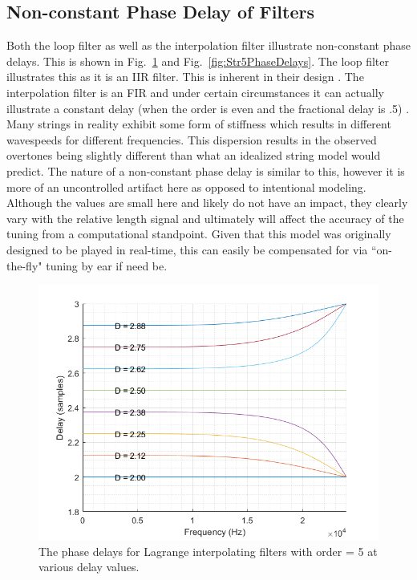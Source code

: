 \documentclass[../main.tex]{subfiles}
\begin{document}
\subsection{Non-constant Phase Delay of Filters}
Both the loop filter as well as the interpolation filter illustrate non-constant phase delays. This is shown in Fig.~\ref{fig:LagrangePhaseDelays} and Fig.~\ref{fig:Str5PhaseDelays}. The loop filter illustrates this as it is an IIR filter. This is inherent in their design . The interpolation filter is an FIR and under certain circumstances it can actually illustrate a constant delay (when the order is even and the fractional delay is .5) . Many strings in reality exhibit some form of stiffness which results in different wavespeeds for different frequencies. This dispersion results in the observed overtones being slightly different than what an idealized string model would predict. The nature of a non-constant phase delay is similar to this, however it is more of an uncontrolled artifact here as opposed to intentional modeling. Although the values are small here and likely do not have an impact, they clearly vary with the relative length signal and ultimately will affect the accuracy of the tuning from a computational standpoint. Given that this model was originally designed to be played in real-time, this can easily be compensated for via ``on-the-fly" tuning by ear if need be.

\begin{figure}[h]
    \centering
    \includegraphics[scale=.65]{./images/plots/LagrangePhaseDelays.png}
    \caption{The phase delays for Lagrange interpolating filters with order = 5 at various delay values.}
    \label{fig:LagrangePhaseDelays}
\end{figure}
\end{document}
